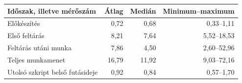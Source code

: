 \begin{tabularx}{\textwidth}{@{}Xrrr@{}}
\toprule
Időszak, illetve mérőszám & Átlag & Medián & Minimum--maximum \\
\midrule
Előkészítés & 0,72 & 0,68 & 0,33--1,11 \\
Első feltárás & 8,21 & 7,64 & 5,52--18,53 \\
Feltárás utáni munka & 7,86 & 4,50 & 2,60--52,96 \\
\midrule
Teljes munkamenet & 16,79 & 11,92 & 9,03--72,16 \\
\midrule
Utolsó szkript belső futásideje & 0,92 & 0,84 & 0,57--1,70 \\
\bottomrule
\end{tabularx}
